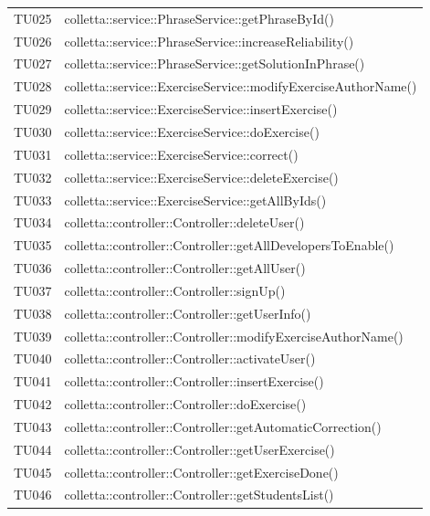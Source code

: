 \begin{tabularx}{\textwidth}{cX}
	TU025 & colletta::service::PhraseService::getPhraseById() \\
	TU026 & colletta::service::PhraseService::increaseReliability() \\
	TU027 & colletta::service::PhraseService::getSolutionInPhrase() \\
	TU028 & colletta::service::ExerciseService::modifyExerciseAuthorName() \\
	TU029 & colletta::service::ExerciseService::insertExercise() \\
	TU030 & colletta::service::ExerciseService::doExercise() \\
	TU031 & colletta::service::ExerciseService::correct() \\
	TU032 & colletta::service::ExerciseService::deleteExercise() \\
	TU033 & colletta::service::ExerciseService::getAllByIds() \\
	TU034 & colletta::controller::Controller::deleteUser() \\
	TU035 & colletta::controller::Controller::getAllDevelopersToEnable() \\
	TU036 & colletta::controller::Controller::getAllUser() \\
	TU037 & colletta::controller::Controller::signUp() \\
	TU038 & colletta::controller::Controller::getUserInfo() \\
	TU039 & colletta::controller::Controller::modifyExerciseAuthorName() \\
	TU040 & colletta::controller::Controller::activateUser() \\
	TU041 & colletta::controller::Controller::insertExercise() \\
	TU042 & colletta::controller::Controller::doExercise() \\
	TU043 & colletta::controller::Controller::getAutomaticCorrection() \\
	TU044 & colletta::controller::Controller::getUserExercise() \\
	TU045 & colletta::controller::Controller::getExerciseDone() \\
	TU046 & colletta::controller::Controller::getStudentsList() \\

\end{tabularx}
